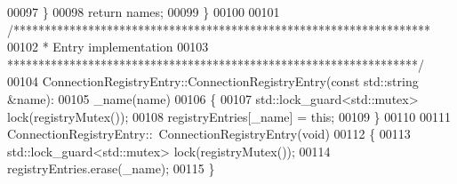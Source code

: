 \begin{DoxyCode}
00097     \}
00098     \textcolor{keywordflow}{return} names;
00099 \}
00100 
00101 \textcolor{comment}{/*******************************************************************}
00102 \textcolor{comment}{ * Entry implementation}
00103 \textcolor{comment}{ ******************************************************************/}
00104 ConnectionRegistryEntry::ConnectionRegistryEntry(\textcolor{keyword}{const} std::string &name):
00105     \_name(name)
00106 \{
00107     std::lock\_guard<std::mutex> lock(registryMutex());
00108     registryEntries[_name] = \textcolor{keyword}{this};
00109 \}
00110 
00111 ConnectionRegistryEntry::~ConnectionRegistryEntry(\textcolor{keywordtype}{void})
00112 \{
00113     std::lock\_guard<std::mutex> lock(registryMutex());
00114     registryEntries.erase(_name);
00115 \}
\end{DoxyCode}

